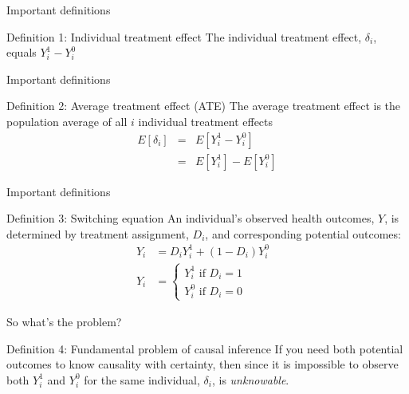 \documentclass{beamer}
\begin{document}
\begin{frame}{Important definitions}
	\begin{block}{Definition 1: Individual treatment effect}
	    The individual treatment effect,  $\delta_i$, equals $Y_i^1-Y_i^0$
	\end{block}
\end{frame}

\begin{frame}{Important definitions}
	\begin{block}{Definition 2: Average treatment effect (ATE)}
        The average treatment effect is the population average of all $i$ individual treatment effects 
        \begin{eqnarray*}
        E[\delta_i]&=&E[Y_i^1-Y_i^0]\\
        &=&E[Y^1_i] - E[Y^0_i]
        \end{eqnarray*}
	\end{block}
\end{frame}

\begin{frame}{Important definitions}
	\begin{block}{Definition 3: Switching equation}
	    An individual's observed health outcomes, $Y$, is determined by treatment assignment, $D_i$, and corresponding potential outcomes:
		      \begin{eqnarray*}
	      Y_i& = D_iY^1_i+(1-D_i)Y^0_i& \\
	      Y_i& = \begin{cases}
	      		Y^1_i\text{ if }D_i=1 \\
			Y^0_i\text{ if }D_i=0
			\end{cases}
	    		\end{eqnarray*}
	\end{block}
\end{frame}

\begin{frame}{So what's the problem?}

	\begin{block}{Definition 4: Fundamental problem of causal inference}	
	If you need both potential outcomes to know causality with certainty, then since it is impossible to observe both $Y_i^1$ and $Y_i^0$ for the same individual, $\delta_i$, is \emph{unknowable}.
	\end{block}

\end{frame}
\end{document}
